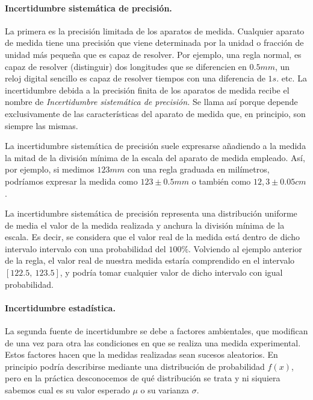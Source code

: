 \paragraph{Incertidumbre sistemática de precisión.}
 La primera es la precisión limitada de los aparatos de medida. Cualquier aparato de medida tiene una precisión que viene determinada por la unidad o fracción de unidad más pequeña que es capaz de resolver. Por ejemplo, una regla normal, es capaz de resolver (distinguir) dos longitudes que se diferencien en $0.5 mm$, un reloj digital sencillo es capaz de resolver tiempos con una diferencia de $1s.$ etc.
La incertidumbre debida a la precisión finita de los aparatos de medida recibe el nombre de \emph{Incertidumbre sistemática de precisión.} 
Se llama así porque depende exclusivamente de las características del aparato de medida que, en principio, son siempre las mismas.

La incertidumbre sistemática de precisión suele expresarse añadiendo a la medida la mitad de la división mínima de la escala del aparato de medida empleado. Así, por ejemplo, si medimos $123 mm$ con una regla graduada en milímetros, podríamos expresar la  medida como $123 \pm 0.5 mm$ o también como $12,3\pm0.05cm$.


La incertidumbre sistemática de precisión representa una distribución uniforme de media el valor de la medida realizada y anchura la división mínima de la escala. Es decir, se considera que el valor real de la medida está dentro de dicho intervalo intervalo con una probabilidad del $100\%$. Volviendo al ejemplo anterior de la regla, el valor real de nuestra medida estaría comprendido en el intervalo $[122.5,\ 123.5 ]$, y podría tomar cualquier valor de dicho intervalo con igual probabilidad. 

\paragraph{Incertidumbre estadística.} La segunda fuente de incertidumbre se debe a factores ambientales, que modifican de una vez para otra las condiciones en que se realiza una medida experimental. Estos factores hacen que la medidas realizadas sean sucesos aleatorios. En principio podría describirse mediante una distribución de probabilidad $f(x)$, pero en la práctica desconocemos de qué distribución se trata y ni siquiera sabemos cual es su valor esperado $\mu$ o su varianza $\sigma$. 

